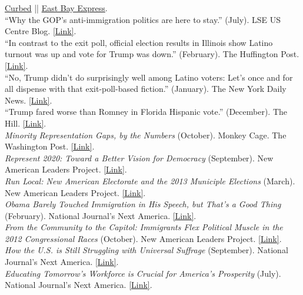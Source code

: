 \documentclass[11pt, a4paper]{article}
\newcommand{\years}[1]{\marginnote{\scriptsize #1}}
\begin{document}
\indent \href{https://sf.curbed.com/2018/4/4/17198326/oakland-fruitvale-transit-village-housing-displacement-gentrification}{Curbed} || 
\indent \href{https://www.eastbayexpress.com/SevenDays/archives/2018/04/02/mondays-briefing-ucla-study-says-fruitvale-village-is-a-model-for-urban-planning-stephon-clark-protestor-struck-by-sacramento-sheriffs-veh}{East Bay Express}.\\
\years{} ``Why the GOP’s anti-immigration politics are here to stay.'' (July). LSE US Centre Blog. \href{http://blogs.lse.ac.uk/usappblog/2018/07/09/why-the-gops-anti-immigration-politics-are-here-to-stay/}{[Link]}.\\
\years{2017} ``In contrast to the exit poll, official election results in Illinois show Latino turnout was up and vote for Trump was down.'' (February). The Huffington Post. \href{http://huff.to/2lC9rc8}{[Link]}.\\
\years{} ``No, Trump didn't do surprisingly well among Latino voters: Let's once and for all dispense with that exit-poll-based fiction.'' (January). The New York Daily News. \href{http://nydn.us/2jtowIr}{[Link]}.\\
\years{2016} ``Trump fared worse than Romney in Florida Hispanic vote.'' (December). The Hill. \href{http://bit.ly/2gNFKOz}{[Link]}.\\
\years{2014}\textit{Minority Representation Gaps, by the Numbers} (October). Monkey Cage. The Washington Post. \href{http://wapo.st/ZGQntG}{[Link]}.\\
\years{}\textit{Represent 2020: Toward a Better Vision for Democracy} (September). New American Leaders Project. \href{http://bit.ly/1tLsVcV}{[Link]}.\\
\years{2013}\textit{Run Local: New American Electorate and the 2013 Municiple Elections} (March). New American Leaders Project. \href{http://bit.ly/WKwtGR}{[Link]}.\\
\years{}\textit{Obama Barely Touched Immigration in His Speech, but That's a Good Thing} (February). National Journal's Next America. \href{http://bit.ly/12R7lVG}{[Link]}.\\
\years{2012}\textit{From the Community to the Capitol: Immigrants Flex Political Muscle in the 2012 Congressional Races} (October). New American Leaders Project. \href{http://bit.ly/RLVzVF}{[Link]}.\\
\years{}\textit{How the U.S. is Still Struggling with Universal Suffrage} (September). National Journal's Next America.  \href{http://bit.ly/UDAUpD}{[Link]}.\\
\years{}\textit{Educating Tomorrow's Workforce is Crucial for America's Prosperity} (July). National Journal's Next America. \href{http://bit.ly/NCHoyf}{[Link]}.\\
\end{document}
